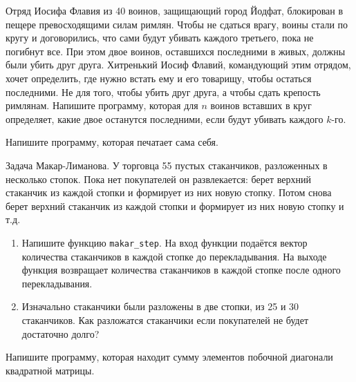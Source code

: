 \documentclass[pdftex,11pt,openany]{book}\usepackage[]{graphicx}\usepackage[]{color}
\begin{document}
\begin{problem}
Отряд Иосифа Флавия из 40 воинов, защищающий город Йодфат, блокирован в пещере превосходящими силам римлян. Чтобы не сдаться врагу, воины стали по кругу и договорились, что сами будут убивать каждого третьего, пока не погибнут все. При этом двое воинов, оставшихся последними в живых, должны были убить друг друга. Хитренький Иосиф Флавий, командующий этим отрядом, хочет определить, где нужно встать ему и его товарищу, чтобы остаться последними. Не для того, чтобы убить друг друга, а чтобы сдать крепость римлянам. Напишите программу, которая для $n$ воинов вставших в круг определяет, какие двое останутся последними, если будут убивать каждого $k$-го.
\end{problem}

\begin{solution}
\end{solution}


\begin{problem}
Напишите программу, которая печатает сама себя.
\end{problem}

\begin{solution}
\end{solution}

\begin{problem}
Задача Макар-Лиманова. У торговца 55 пустых стаканчиков, разложенных в несколько стопок. Пока нет покупателей он развлекается: берет верхний стаканчик из каждой стопки и формирует из них новую стопку. Потом снова берет верхний стаканчик из каждой стопки и формирует из них новую стопку и т.д.
\begin{enumerate}
\item Напишите функцию \verb|makar_step|. На вход функции подаётся вектор количества стаканчиков в каждой стопке до перекладывания. На выходе функция возвращает количества стаканчиков в каждой стопке после одного перекладывания.
\item Изначально стаканчики были разложены в две стопки, из 25 и 30 стаканчиков. Как разложатся стаканчики если покупателей не будет достаточно долго?
\end{enumerate}
\end{problem}

\begin{solution}
\end{solution}


\begin{problem}
Напишите программу, которая находит сумму элементов побочной диагонали квадратной матрицы. 
\end{problem}
\end{document}
